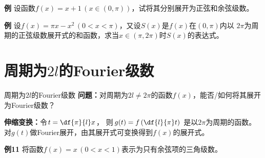 \begin{frame}
	\linespread{1.2}
	\begin{exampleblock}{{\bf 例}\hfill}
		设函数$f(x)=x+1\,(x\in(0,\pi))$，试将其分别展开为正弦和余弦级数。\pause 
	\end{exampleblock}
	\begin{center}
		\pause 
		
	\end{center}
\end{frame}

\begin{frame}
	\linespread{1.2}
	\begin{exampleblock}{{\bf 例}\hfill}
		设$f(x)=\pi x-x^2\,(0<x<\pi)$，又设$S(x)$是$f(x)$在$(0,\pi)$内以
		$2\pi$为周期的正弦级数展开式的和函数，求当$x\in(\pi,2\pi)$时$S(x)$的表达式。
	\end{exampleblock}
\end{frame}

\section{周期为$2l$的Fourier级数}

\begin{frame}{周期为$2l$的Fourier级数}
	\linespread{1.4}\pause 
	{\bf 问题：}对周期为$2l\ne2\pi$的函数$f(x)$，能否/如何将其展开为Fourier级数？\pause 
	
	\alert{\bf 伸缩变换：}\pause 令$t=\df{\pi}{l}x$，\pause
	则$g(t)=f\left(\df{l}{\pi}t\right)$ 是以$2\pi$为周期的函数。\pause 
	对$g(t)$做Fourier展开，由其展开式可变换得到$f(x)$的展开式。\pause 
	
	\bigskip
	\begin{exampleblock}{{\bf 例11}\hfill}
		将函数$f(x)=x\,(0<x<1)$表示为只有余弦项的三角级数。
	\end{exampleblock}
\end{frame}

